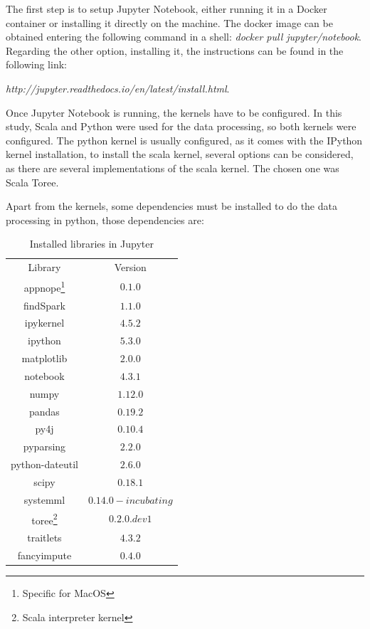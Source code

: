 \documentclass[11pt]{book} %
\begin{document}
    The first step is to setup Jupyter Notebook, either running it in a Docker container or installing it directly on the machine. The docker image can be obtained entering the following command in a shell: \emph{docker pull jupyter/notebook}. Regarding the other option, installing it, the instructions can be found in the following link:

    \emph{http://jupyter.readthedocs.io/en/latest/install.html}.

    Once Jupyter Notebook is running, the kernels have to be configured. In this study, Scala and Python were used for the data processing, so both kernels were configured. The python kernel is usually configured, as it comes with the IPython kernel installation, to install the scala kernel, several options can be considered, as there are several implementations of the scala kernel. The chosen one was Scala Toree.

    Apart from the kernels, some dependencies must be installed to do the data processing in python, those dependencies are:

    \begin{table}[!ht]
      \centering
      \begin{tabular}{ c c }
        \hline

          Library & Version \\
          appnope\footnote{Specific for MacOS} & $0.1.0$ \\
          findSpark & $1.1.0$ \\
          ipykernel & $4.5.2$ \\
          ipython & $5.3.0$ \\
          matplotlib & $2.0.0$ \\
          notebook & $4.3.1$ \\
          numpy & $1.12.0$ \\
          pandas & $0.19.2$ \\
          py4j & $0.10.4$ \\
          pyparsing & $2.2.0$ \\
          python-dateutil & $2.6.0$ \\
          scipy & $0.18.1$ \\
          systemml & $0.14.0-incubating$ \\
          toree\footnote{Scala interpreter kernel} & $0.2.0.dev1$ \\
          traitlets & $4.3.2$ \\
          fancyimpute & $0.4.0$ \\

        \hline
      \end{tabular}
      \caption{Installed libraries in Jupyter}
      \label{tab:python_libraries}
    \end{table}
\end{document}
